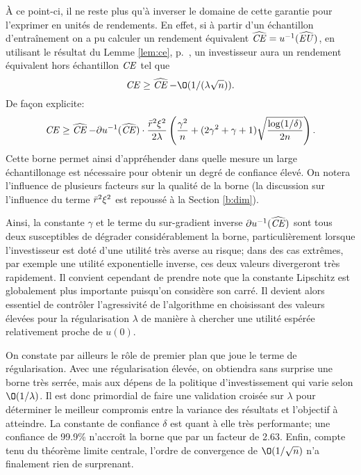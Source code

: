 À ce point-ci, il ne reste plus qu'à inverser le domaine de cette garantie pour l'exprimer
en unités de rendements. En effet, si à partir d'un échantillon d'entraînement on a pu
calculer un rendement équivalent $\operatorname{\widehat{\operatorname{\mbox{\textit{CE}}}}} = u^{-1}(\operatorname{\widehat{\operatorname{\mbox{\textit{EU}}}}})$, en utilisant le résultat du
Lemme \ref{lem:ce}, p.~\pageref{lem:ce}, un investisseur aura un rendement équivalent hors
échantillon $\operatorname{\mbox{\textit{CE}}}$ tel que
\begin{equation}
  \nCE \geq \nhCE - \O(1/(\lambda\sqrt{n})).
\end{equation}
De façon explicite:
\begin{equation}
  \operatorname{\mbox{\textit{CE}}} \geq \operatorname{\widehat{\operatorname{\mbox{\textit{CE}}}}} - \partial u^{-1}(\operatorname{\widehat{\operatorname{\mbox{\textit{CE}}}}})\cdot \frac{\bar r^2\xi^2}{2\lambda}\left(\frac{\gamma^2}{n} + (2\gamma^2+\gamma+1)\sqrt{\frac{\log(1/\delta)}{2n}}\right).
\end{equation}
Cette borne permet ainsi d'appréhender dans quelle mesure un large échantillonage est
nécessaire pour obtenir un degré de confiance élevé. On notera l'influence de plusieurs
facteurs sur la qualité de la borne (la discussion sur l'influence du terme $\bar r^2\xi^2$
est repoussé à la Section \ref{b:dim}).

Ainsi, la constante $\gamma$ et le terme du sur-gradient inverse $\partial u^{-1}(\operatorname{\widehat{\operatorname{\mbox{\textit{CE}}}}})$ sont tous
deux susceptibles de dégrader considérablement la borne, particulièrement lorsque
l'investisseur est doté d'une utilité très averse au risque; dans des cas extrêmes, par
exemple une utilité exponentielle inverse, ces deux valeurs divergeront très
rapidement. Il convient cependant de prendre note que la constante Lipschitz est
globalement plus importante puisqu'on considère son carré. Il devient alors essentiel de
contrôler l'agressivité de l'algorithme en choisissant des valeurs élevées pour la
régularisation $\lambda$ de manière à chercher une utilité espérée relativement proche de
$u(0)$.

On constate par ailleurs le rôle de premier plan que joue le terme de régularisation. Avec
une régularisation élevée, on obtiendra sans surprise une borne très serrée, mais aux
dépens de la politique d'investissement qui varie selon $\O(1/\lambda)$. Il est donc primordial
de faire une validation croisée sur $\lambda$ pour déterminer le meilleur compromis entre la
variance des résultats et l'objectif à atteindre. La constante de confiance $\delta$ est quant
à elle très performante; une confiance de \num{99.9}\% n'accroît la borne que par un
facteur de \num{2.63}. Enfin, compte tenu du théorème limite centrale, l'ordre de
convergence de $\O(1/\sqrt{n})$ n'a finalement rien de surprenant.




